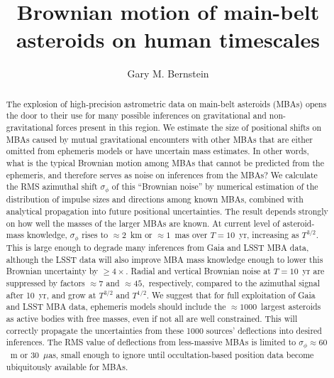 \documentclass[linenumbers, onecolumn]{aastex631}
\begin{document}
\title{Brownian motion of main-belt asteroids on human timescales} 

\author[0000-0002-8613-8259]{Gary M. Bernstein}


\begin{abstract}
  The explosion of high-precision astrometric data on main-belt
  asteroids (MBAs) opens the door to their use for many possible
  inferences on gravitational and non-gravitational forces present in
  this region.  We estimate the size of positional shifts on MBAs
  caused by mutual gravitational encounters with other MBAs that are
  either omitted from ephemeris models or have uncertain mass
  estimates. In other words, what is the typical Brownian motion among
  MBAs that cannot be predicted from the ephemeris, and therefore
  serves as noise on inferences from the MBAs?  We calculate the RMS
  azimuthal shift $\sigma_\phi$ of this ``Brownian noise''  by
  numerical estimation of the distribution of impulse sizes and
  directions among known MBAs, combined with analytical propagation
  into future positional uncertainties.  The result depends strongly
  on how well the masses of the larger MBAs are known.  At current
  level of asteroid-mass knowledge, $\sigma_\phi$ rises to
  $\approx2$~km or $\approx1$~mas over $T=10$~yr, increasing as
  $T^{3/2}.$  This is large enough to degrade many inferences from
  Gaia and LSST MBA data, although the LSST data will also improve MBA
  mass knowledge enough to lower this Brownian uncertainty by
  $\ge4\times.$  Radial and vertical Brownian noise  at $T=10$~yr are
  suppressed by factors $\approx7$ and $\approx45,$ respectively,
  compared to the azimuthal signal after 10~yr, and grow at $T^{3/2}$
  and $T^{1/2}.$  We suggest that for full exploitation of Gaia and
  LSST MBA data, ephemeris models should include the
  $\approx1000$~largest asteroids as active bodies with free masses,
  even if not all are well constrained.  This will correctly propagate
  the uncertainties from these 1000 sources' deflections into desired
  inferences. The RMS value of deflections from less-massive MBAs is limited to $\sigma_\phi\approx60$~m or 30~$\mu$as, small enough to ignore until occultation-based position data become ubiquitously available for MBAs.
\end{abstract}

\end{document}
